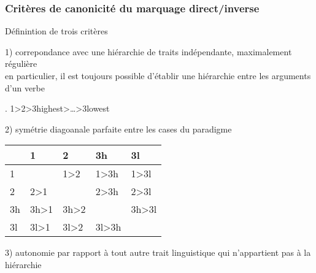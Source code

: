 \begin{frame}
\frametitle{Critères de canonicité du marquage direct/inverse}
\begin{blackwideitemize}
\item Définintion de trois critères
\pause
\begin{smallwideitemize}
\item[1)] correpondance avec une hiérarchie de traits indépendante,
  maximalement régulière\\
\ra en particulier, il est toujours possible d'établir une hiérarchie
entre les arguments d'un verbe\\

\begin{center}
\ex. 1>2>{\sc 3highest}>\ldots>{\sc 3lowest}\label{ex:canhierarchy}

\end{center}

\pause
\item[2)] symétrie diagoanale parfaite entre les cases du paradigme

\vspace*{.3cm}
\begin{tabular}{|l|llll|} 
\hline
&1 & 2 &{\sc 3h}&{\sc 3l}\\
\hline
 1 &\grise{} &1>2  & 1>{\sc 3h}&1>{\sc 3l} \\
 2&\cellcolor{infl3} 2>1 &\grise{}&2>{\sc 3h}&2>{\sc 3l}\\
 {\sc 3h}&\cellcolor{infl3} {\sc 3h}>1 &\cellcolor{infl3} {\sc 3h}>2 &\grise{}&{\sc 3h}>{\sc 3l}\\
 {\sc 3l}&\cellcolor{infl3} {\sc 3l}>1 &\cellcolor{infl3} {\sc 3l}>2 &\cellcolor{infl3} {\sc
   3l}>{\sc 3h}&\grise{}\\
\hline

\end{tabular}

\pause

\item[3)] autonomie par rapport à tout autre trait linguistique qui
  n'appartient pas à la hiérarchie
\end{smallwideitemize}
\end{blackwideitemize}

\begin{center}



\end{center}
\end{frame}
